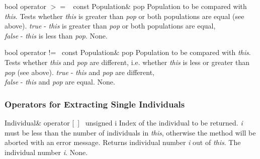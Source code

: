\vspace*{4ex}

\setConstInstance
\printMethodWithOneParam
{bool}
{operator $>=$\ }
{const Population\&}
{pop}
{Population to be compared with {\em this}.}
{Tests whether {\em this} is greater than {\em pop} or both
 populations are equal (see above).}
{{\em true} - {\em this} is greater than {\em pop} or both populations
are equal,\\
 {\em false} - {\em this} is less than {\em pop}.}
{None.}

\vspace*{4ex}

\setConstInstance
\printMethodWithOneParam
{bool}
{operator !=\ }
{const Population\&}
{pop}
{Population to be compared with {\em this}.}
{Tests whether {\em this} and {\em pop} are different, i.e.
 whether {\em this} is less or greater than {\em pop}
 (see above).}
{{\em true} - {\em this} and {\em pop} are different,\\
 {\em false} - {\em this} and {\em pop} are equal.}
{None.}

\clearpage

\subsubsection{Operators for Extracting Single Individuals}

\setNormalInstance
\printMethodWithOneParam
{Individual\&}
{operator [\ ]\ }
{unsigned}
{i}
{Index of the individual to be returned. {\em i} must be less
 than the number of individuals in {\em this}, otherwise the method
 will be aborted with an error message.}
{Returns individual number {\em i} out of {\em this}.}
{The individual number {\em i}.}
{None.}

\vspace*{4ex}


